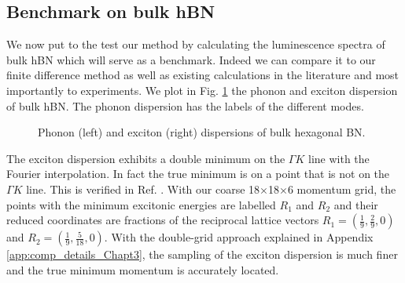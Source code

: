 \subsection{Benchmark on bulk hBN} \label{sec:bulk_hBN}
We now put to the test our method by calculating the luminescence spectra of bulk hBN which will serve as a benchmark. Indeed we can compare it to our finite difference method as well as existing calculations in the literature and most importantly to experiments. We plot in Fig. \ref{fig:ph_exc_disp_hBN} the phonon and exciton dispersion of bulk \acrlong{hBN}. The phonon dispersion has the labels of the different modes.
\begin{figure}[h!t]%
	\vspace{0.2cm}
	\setcapindent{2em}
	\centering
    \caption{Phonon (left) and exciton (right) dispersions of bulk hexagonal BN.}
    \label{fig:ph_exc_disp_hBN} %
\end{figure}
The exciton dispersion exhibits a double minimum on the $\Gamma K$ line with the Fourier interpolation. In fact the true minimum is on a point that is not on the $\Gamma K$ line. This is verified in Ref. \cite{zanfrognini2023distinguishing}.
With our coarse 18$\times$18$\times$6 momentum grid, the points with the minimum excitonic energies are labelled $R_1$ and $R_2$ and their reduced coordinates are fractions of the reciprocal lattice vectors $R_1=(\tfrac{1}{9},\tfrac{2}{9},0)$ and $R_2=(\tfrac{1}{9},\tfrac{5}{18},0)$. With the double-grid approach explained in Appendix \ref{app:comp_details_Chapt3}, the sampling of the exciton dispersion is much finer and the true minimum momentum is accurately located.


